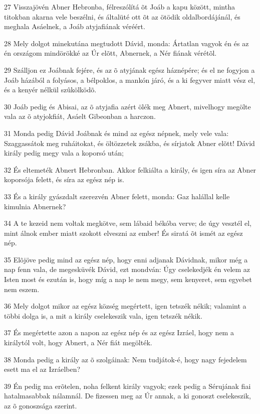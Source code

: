 \par 27 Visszajövén Abner Hebronba, félreszólítá õt Joáb a kapu között, mintha titokban akarna vele beszélni, és általüté ott õt az ötödik oldalbordájánál, és meghala Asáelnek,  a Joáb atyjafiának véréért.
\par 28 Mely dolgot minekutána megtudott Dávid, monda: Ártatlan vagyok én és az én országom mindörökké az Úr elõtt, Abnernek, a Nér fiának vérétõl.
\par 29 Szálljon ez Joábnak fejére, és az õ atyjának egész háznépére; és el ne fogyjon a Joáb házából a folyásos, a bélpoklos, a mankón járó, és a ki fegyver miatt vész el, és a kenyér nélkül szûkölködõ.
\par 30 Joáb pedig és Abisai, az õ atyjafia azért ölék meg Abnert, mivelhogy megölte vala az õ atyjokfiát, Asáelt Gibeonban a harczon.
\par 31 Monda pedig Dávid Joábnak és mind az egész népnek, mely vele vala: Szaggassátok meg ruháitokat, és öltözzetek zsákba, és sírjatok Abner elõtt! Dávid király pedig megy vala a koporsó után;
\par 32 És eltemeték Abnert Hebronban. Akkor felkiálta a király, és igen síra az Abner koporsója felett, és síra az egész nép is.
\par 33 És a király gyászdalt szerezvén Abner felett, monda: Gaz halállal kelle kimulnia Abnernek?
\par 34 A te kezeid nem voltak megkötve, sem lábaid békóba verve; de úgy vesztél el, mint álnok ember miatt szokott elveszni az ember! És siratá õt ismét az egész nép.
\par 35 Elõjöve pedig mind az egész nép, hogy enni adjanak Dávidnak, mikor még a nap fenn vala, de megesküvék Dávid, ezt mondván: Úgy cselekedjék én velem az Isten most és ezután is, hogy míg a nap le nem megy, sem kenyeret, sem egyebet nem eszem.
\par 36 Mely dolgot mikor az egész község megértett, igen tetszék nékik; valamint a többi dolga is, a mit a király cselekeszik vala, igen tetszék nékik.
\par 37 És megértette azon a napon az egész nép és az egész Izráel, hogy nem a királytól volt, hogy Abnert, a Nér fiát megölték.
\par 38 Monda pedig a király az õ szolgáinak: Nem tudjátok-é, hogy nagy fejedelem esett ma el az Izráelben?
\par 39 Én pedig ma erõtelen, noha felkent király vagyok; ezek pedig a Sérujának fiai hatalmasabbak nálamnál. De fizessen meg az Úr annak, a ki  gonoszt cselekeszik, az õ gonoszsága szerint.


